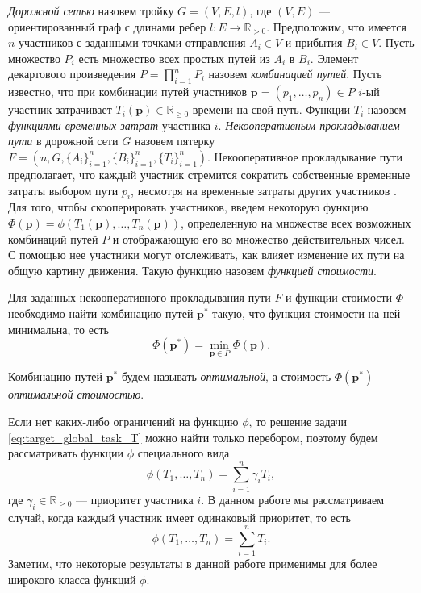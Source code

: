 \documentclass[12pt, a4paper]{article}
\DeclareMathOperator*{\minn}{min}
\begin{document}
\textit {Дорожной сетью} назовем тройку $G = (V, E, l)$, где $(V, E)$ --- ориентированный граф с длинами ребер $l: E \rightarrow \mathbb{R}_{>0} $.  Предположим, что имеется $n$ участников с заданными точками отправления $A_i \in V$ и прибытия $B_i \in V$. Пусть множество $P_i$ есть множество всех простых путей из $A_i$ в $B_i$. Элемент декартового произведения ${P = \prod \limits_{i = 1} ^ n P_i}$ назовем \textit{комбинацией путей}. Пусть известно, что при комбинации путей участников $\textbf{p} = \left(p_1, \ldots, p_n\right)\in P$ $i$-ый участник затрачивает $T_i(\textbf{p}) \in \mathbb{R}_{\ge 0}$ времени на свой путь. 
Функции $T_i$ назовем \textit{функциями временных затрат} участника $i$.
\textit{Некооперативным прокладыванием пути} в дорожной сети $G$ назовем пятерку $F = (n, G, \{A_i\}_{i = 1}^{n}, \{B_i\}_{i = 1}^{n}, \{T_i\}_{i = 1}^{n})$. Некооперативное прокладывание пути предполагает, что каждый участник стремится сократить собственные временные затраты выбором пути $p_i$, несмотря на временные затраты других участников \cite{teor_igri}. 
Для того, чтобы скооперировать участников, введем некоторую функцию $\Phi (\textbf{p}) = \phi (T_1 (\textbf{p}), \ldots, T_n(\textbf{p}))$, определенную на множестве всех возможных комбинаций путей $P$ и отображающую его во множество действительных чисел. С помощью нее участники могут отслеживать, как влияет изменение их пути на общую картину движения. Такую функцию назовем \textit{функцией стоимости}.

Для заданных некооперативного прокладывания пути $F$ и функции стоимости $\Phi$ необходимо найти комбинацию путей $\textbf{p}^*$ такую, что функция стоимости на ней минимальна, то есть
\begin{equation}
	\label{eq:target_global_task_T} 
	\Phi (\textbf{p}^*) = \minn\limits_{ \textbf{p} \in P} \Phi (\textbf{p}).
\end{equation}

Комбинацию путей $\textbf{p}^*$ будем называть \textit {оптимальной}, а стоимость  $ \Phi (\textbf{p}^*)$ --- \textit{оптимальной стоимостью}.

Если нет каких-либо ограничений на функцию $\phi$, то решение задачи \eqref{eq:target_global_task_T} можно найти только перебором, поэтому будем рассматривать функции $\phi$ специального вида $$\phi(T_1, \ldots, T_n) = \sum\limits_{i = 1}^n \gamma_iT_i,$$ где $\gamma_i \in \mathbb{R}_{\ge 0}$ --- приоритет участника $i$. В данном работе мы рассматриваем случай, когда каждый участник имеет одинаковый приоритет, то есть 
\begin{equation*}
\phi(T_1, \ldots, T_n) = \sum\limits_{i = 1}^nT_i.
\end{equation*}
Заметим, что некоторые результаты в данной работе применимы для более широкого класса функций $\phi$. 
\end{document}
